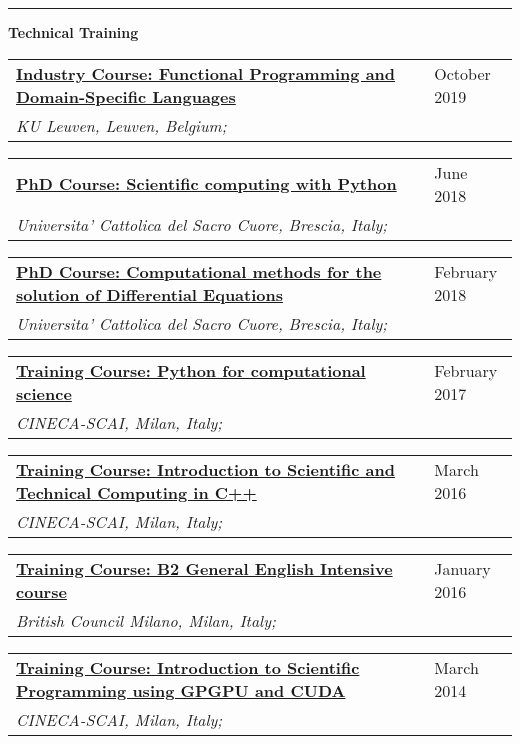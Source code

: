 \documentclass[a4paper]{article}
\newcommand{\block}[1]{\hrule \vspace{0.2cm} \textbf{\Large #1} \vspace{0.2cm}}
\newcommand{\longvoice}[8]{
    \begin{tabular}{p{0.83\linewidth} p{0.17\linewidth} }
        \textbf{\href{#3}{#2: #1}} & #4 
        \\ 
        \textit{#5, #6, #7;} & {\small\emph{#8}}
    \end{tabular}
    \vspace{.5em}
    }
\begin{document}
    \block{Technical Training}
   
    \longvoice{Functional Programming and Domain-Specific Languages}
        {Industry Course}
        {https://dtai.cs.kuleuven.be/events/fpcourse/}
        {October 2019}
        {KU Leuven}
        {Leuven}
        {Belgium}
        {}
    \longvoice{Scientific computing with Python}
        {PhD Course}
        {https://web.archive.org/web/20180604081514/http://dmf.unicatt.it/~della/pythoncourse18/}
        {June 2018}
        {Universita' Cattolica del Sacro Cuore}
        {Brescia}
        {Italy}
        {}
    \longvoice{Computational methods for the solution of Differential Equations}
        {PhD Course}
        {https://www.dropbox.com/s/q2rapau2k49n5t7/1802-Course-NumericalPdeAvella.pdf?dl=0}
        {February 2018}
        {Universita' Cattolica del Sacro Cuore}
        {Brescia}
        {Italy}
        {}
    \longvoice{Python for computational science}
        {Training Course}
        {https://web.archive.org/web/20170623170252/https://eventi.cineca.it/en/hpc/python-computational-science}
        {February 2017}
        {CINECA-SCAI}
        {Milan}
        {Italy}
        {}
    \longvoice{Introduction to Scientific and Technical Computing in C++}
        {Training Course}
        {https://web.archive.org/save/http://www.hpc.cineca.it/content/introduction-object-oriented}
        {March 2016}
        {CINECA-SCAI}
        {Milan}
        {Italy}
        {}
    \longvoice{B2 General English Intensive course}
        {Training Course}
        {https://www.britishcouncil.it/en/english/courses-adults/general}
        {January 2016}
        {British Council Milano}
        {Milan}
        {Italy}
        {}
    \longvoice{Introduction to Scientific Programming using GPGPU and CUDA}
        {Training Course}
        {https://web.archive.org/web/20170623171128/http://www.hpc.cineca.it/content/introduction-to-gpu}
        {March 2014}
        {CINECA-SCAI}
        {Milan}
        {Italy}
        {}
    
\end{document}
